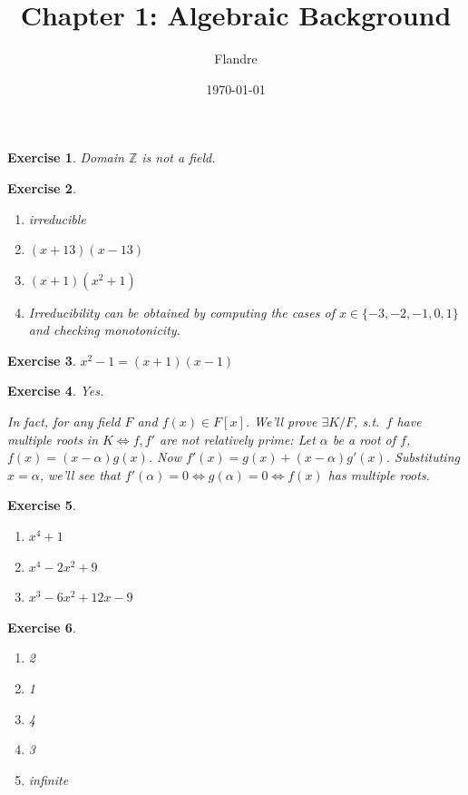 \documentclass{article}
\title{Chapter 1: Algebraic Background}
\author{Flandre}
\date{\today}
\theoremstyle{breakstyle}
\newtheorem{exercise}{Exercise}[section]
\begin{document}
\maketitle

\setcounter{section}{1}

\begin{exercise}
    Domain $\mathbb{Z}$ is not a field.
\end{exercise}

\begin{exercise}
    \leavevmode \vspace{-\baselineskip}
    \begin{enumerate}[label=\alph*)]
        \item irreducible
        \item $(x + 13)(x - 13)$
        \item $(x + 1)(x^2 + 1)$
        \item Irreducibility can be obtained by computing the cases of $x \in \{-3, -2, -1, 0, 1\}$ and checking monotonicity.
    \end{enumerate}
\end{exercise}

\begin{exercise}
    $x^2 - 1 = (x + 1)(x - 1)$
\end{exercise}

\begin{exercise}
    Yes.

    In fact, for any field $F$ and $f(x) \in F[x]$. We'll prove $\exists K/F$, s.t.\ $f$ have multiple roots in $K \Longleftrightarrow f, f'$ are not relatively prime: 
    Let $\alpha$ be a root of $f$, $f(x) = (x - \alpha)g(x)$. Now $f'(x) = g(x) + (x - \alpha)g'(x)$. Substituting $x = \alpha$, we'll see that $f'(\alpha) = 0 \Longleftrightarrow g(\alpha) = 0 \Longleftrightarrow f(x)$ has multiple roots.
\end{exercise}

\begin{exercise}
    \leavevmode \vspace{-\baselineskip}
    \begin{enumerate}[label=\roman*.]
        \item $x^4 + 1$
        \item $x^4 - 2x^2 + 9$
        \item $x^3 - 6x^2 + 12x - 9$
    \end{enumerate}
\end{exercise}

\begin{exercise}
    \leavevmode \vspace{-\baselineskip}
    \begin{enumerate}[label=\alph*)]
        \item 2
        \item 1
        \item 4
        \item 3
        \item infinite
    \end{enumerate}
\end{exercise}
\end{document}
